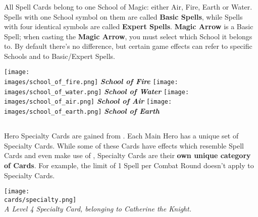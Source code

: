 \begin{multicols*}{2}
\subsubsection*{}
All Spell Cards belong to one School of Magic: either Air, Fire, Earth or Water.
Spells with one School symbol on them are called \textbf{Basic Spells}, while Spells with four identical symbols are called \textbf{Expert Spells}.
\textbf{Magic Arrow} is a Basic Spell; when casting the \textbf{Magic Arrow}, you must select which School it belongs to.
By default there's no difference, but certain game effects can refer to specific Schools and to Basic/Expert Spells.

\begin{minipage}[t]{0.48\textwidth}
  \centering
    \centering
    \texttt{[image: \\images/school\_of\_fire.png]}
    \textit{\textbf{\textcolor{darkcandyapplered}{School of Fire}}}
  \endminipage
    \centering
    \texttt{[image: \\images/school\_of\_water.png]}
    \textit{\textbf{\textcolor{darkcandyapplered}{School of Water}}}
  \endminipage
  \hfill\allowbreak%
  \bigbreak
    \centering
    \texttt{[image: \\images/school\_of\_air.png]}
    \textit{\textbf{\textcolor{darkcandyapplered}{School of Air}}}
  \endminipage
    \centering
    \texttt{[image: \\images/school\_of\_earth.png]}
    \textit{\textbf{\textcolor{darkcandyapplered}{School of Earth}}}
  \endminipage
  \bigbreak
\end{minipage}
\clearpage

\pagebreak
\subsection*{}

Hero Specialty Cards are gained from .
Each Main Hero has a unique set of Specialty Cards.
While some of these Cards have effects which resemble Spell Cards and even make use of , Specialty Cards are their \textbf{own unique category of Cards}.
For example, the limit of 1 Spell per Combat Round doesn't apply to Specialty Cards.

{
    \medskip
    \centering
    \texttt{[image: \\cards/specialty.png]}\\
    \medskip
    \footnotesize\textit{A Level 4 Specialty Card, belonging to Catherine the Knight.}
}


\end{multicols*}
